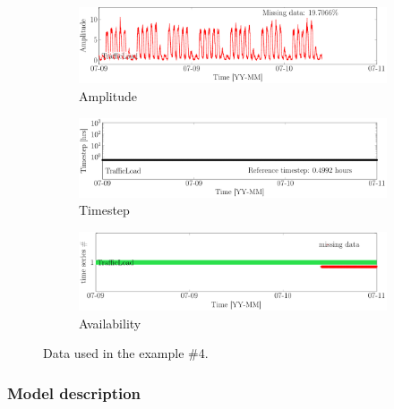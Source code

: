 \begin{figure}[h]
\centering
\begin{subfigure}{\linewidth}\centering
\includegraphics[width=0.9\linewidth]{./docfigs/Example_TRAFFIC/raw/ALL_AMPLITUDES.pdf}
\caption{Amplitude}
\end{subfigure}
\begin{subfigure}{\linewidth}\centering
\includegraphics[width=0.9\linewidth]{./docfigs/Example_TRAFFIC/raw/ALL_TIMESTEPS.pdf} 
\caption{Timestep}
\end{subfigure}
\begin{subfigure}{\linewidth}\centering
\includegraphics[width=0.9\linewidth]{./docfigs/Example_TRAFFIC/raw/AVAILABILITY.pdf}
\caption{Availability}
\end{subfigure}
\caption{Data used in the example \#4.}
\label{fig:DataSummaryTraffic}
\end{figure}


\subsubsection{Model description}
\label{SS:ModelConstructionExampleTraffic}

